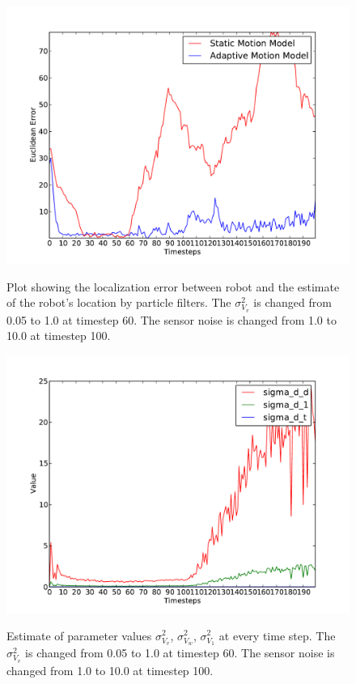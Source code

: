 \documentclass[12pt]{dalcsthesis}
\begin{document}
\begin{figure}
  \centering
     {\includegraphics[height = 3.0 in]{./plots/200_005_05_s_10_100_100_traj_3_trial_1.pdf}}
  \caption{\label{fig-different sensor noise} Plot showing the localization error between robot and the estimate of the robot's location by particle filters. The $\sigma_{V_{v}}^{2}$ is changed from 0.05 to 1.0 at timestep 60. The sensor noise is changed from 1.0 to 10.0 at timestep 100. }
\end{figure}

\begin{figure}
  \centering
     {\includegraphics[height = 3.0 in]{./plots/200_005_05_s_10_100_100_traj_3_trial_1_motion_model_trans.pdf}}
  \caption{\label{fig-different sensor noise motion model trans} Estimate of parameter values $\sigma_{V_{v}}^{2}$, $\sigma_{V_{w}}^{2}$,  $\sigma_{V_{1}}^{2}$ at every time step. The $\sigma_{V_{v}}^{2}$ is changed from 0.05 to 1.0 at timestep 60. The sensor noise is changed from 1.0 to 10.0 at timestep 100.}
\end{figure}
\end{document}
